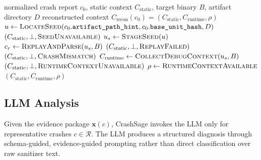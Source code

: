 \documentclass[pdflatex,sn-basic]{sn-jnl}%
\theoremstyle{thmstyleone}%
\theoremstyle{thmstyletwo}%
\theoremstyle{thmstylethree}%
\begin{document}
\begin{algorithm}[!htbp]
\caption{Runtime Context Reconstruction}
\label{alg:runtime-context}
\begin{algorithmic}
\Require normalized crash report \(c_0\), static context \(C_{\mathrm{static}}\), target binary \(B\), artifact directory \(D\)
\Ensure reconstructed context \(C_{\mathrm{recon}}(c_0)=(C_{\mathrm{static}}, C_{\mathrm{runtime}}, \rho)\)
\State \(u \gets \Call{LocateSeed}{c_0.\texttt{artifact\_path\_hint}, c_0.\texttt{base\_unit\_hash}, D}\)
    \State \Return \((C_{\mathrm{static}}, \bot, \textsc{SeedUnavailable})\)
\EndIf
\State \(u_s \gets \Call{StageSeed}{u}\)
\State \(c_r \gets \Call{ReplayAndParse}{u_s, B}\)
    \State \Return \((C_{\mathrm{static}}, \bot, \textsc{ReplayFailed})\)
\EndIf
{}
    \State \Return \((C_{\mathrm{static}}, \bot, \textsc{CrashMismatch})\)
\EndIf
\State \(C_{\mathrm{runtime}} \gets \Call{CollectDebugContext}{u_s, B}\)
    \State \Return \((C_{\mathrm{static}}, \bot, \textsc{RuntimeContextUnavailable})\)
\EndIf
\State \(\rho \gets \textsc{RuntimeContextAvailable}\)
\State \Return \((C_{\mathrm{static}}, C_{\mathrm{runtime}}, \rho)\)
\end{algorithmic}
\end{algorithm}

\FloatBarrier


\subsection{LLM Analysis}
\label{subsec:llm-analysis}

Given the evidence package \(\mathbf{x}(c)\), CrashSage invokes the LLM only for representative crashes \(c\in\mathcal{R}\). The LLM produces a structured diagnosis
through schema-guided, evidence-guided prompting rather than direct classification over raw sanitizer text.
\end{document}
